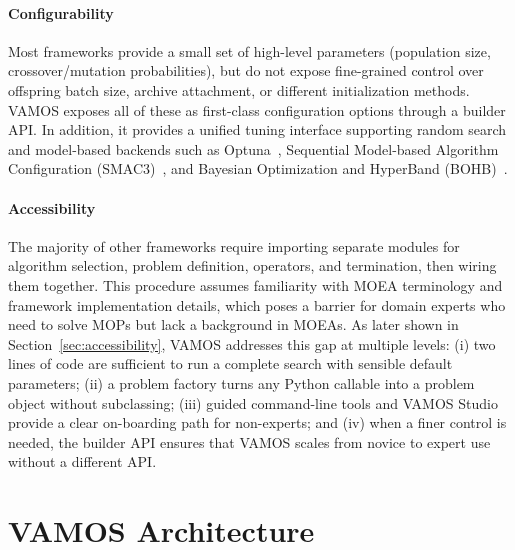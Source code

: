 \documentclass[final,5p,times,twocolumn]{elsarticle}
\begin{document}
\paragraph{Configurability} Most frameworks provide a small set of high-level parameters (population size, crossover/mutation probabilities), but do not expose fine-grained control over offspring batch size, archive attachment, or different initialization methods. VAMOS exposes all of these as first-class configuration options through a builder API. In addition, it provides a unified tuning interface supporting random search and model-based backends such as Optuna~\cite{ASY+19}, Sequential Model-based Algorithm Configuration (SMAC3)~\cite{LEF+22}, and Bayesian Optimization and HyperBand (BOHB)~\cite{FKH18}.

\paragraph{Accessibility} The majority of other frameworks require importing separate modules for algorithm selection, problem definition, operators, and termination, then wiring them together. This procedure assumes familiarity with MOEA terminology and framework implementation details, which poses a barrier for domain experts who need to solve MOPs but lack a background in MOEAs. As later shown in Section~\ref{sec:accessibility}, VAMOS addresses this gap at multiple levels: (i) two lines of code are sufficient to run a complete search with sensible default parameters; (ii) a problem factory turns any Python callable into a problem object without subclassing; (iii) guided command-line tools and VAMOS Studio provide a clear on-boarding path for non-experts; and (iv) when a finer control is needed, the builder API ensures that VAMOS scales from novice to expert use without a different API.

\section{VAMOS Architecture} \label{sec:architecture}
\end{document}
